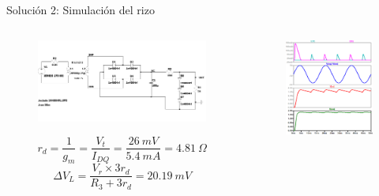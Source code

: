 \documentclass[t,aspectratio=169]{beamer}
\begin{document}
\begin{frame}{Solución 2: Simulación del rizo}
\begin{columns}
\begin{column}{0.6\textwidth}
    \begin{figure}
        \centering
        \includegraphics[width=\textwidth]{figures/fullwave_rectifier_schematic.pdf}
    \end{figure}
    \[ r_d = \dfrac{1}{g_m} = \dfrac{V_t}{I_{DQ}} = \dfrac{26\ mV}{5.4\ mA} = 4.81\ \Omega \]
    \[ \Delta V_L = \dfrac{V_r \times 3 r_d}{R_3 + 3 r_d} = 20.19\ mV \]
\end{column}
\begin{column}{0.4\textwidth}
\begin{figure}
    \centering
    \includegraphics[width=\textwidth]{figures/fullwave_rectifier_ripple_regulation.png}
\end{figure}
\end{column}
\end{columns}
\end{frame}
\end{document}
